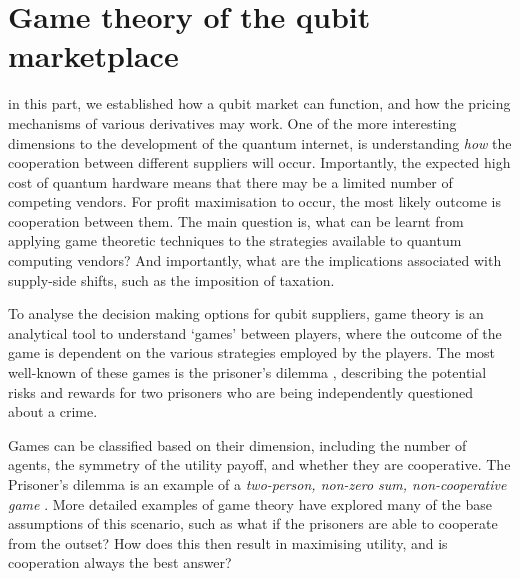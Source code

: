 %
%

\section{Game theory of the qubit marketplace}\label{sec:game_theory}


\newline

\startnormtable

 in this part, we established how a qubit market can function, and how the pricing mechanisms of various derivatives may work. One of the more interesting dimensions to the development of the quantum internet, is understanding \textit{how} the cooperation between different suppliers will occur. Importantly, the expected high cost of  quantum hardware means that there may be a limited number of competing vendors. For profit maximisation to occur, the most likely outcome is cooperation between them. The main question is, what can be learnt from applying game theoretic techniques to the strategies available to quantum computing vendors? And importantly, what are the implications associated with supply-side shifts, such as the imposition of taxation.

To analyse the decision making options for qubit suppliers, game theory is an analytical tool to understand `games' between players, where the outcome of the game is dependent on the various strategies employed by the players. The most well-known of these games is the prisoner's dilemma \cite{bib:Poundstone93}, describing the potential risks and rewards for two prisoners who are being independently questioned about a crime. 

Games can be classified based on their dimension, including the number of agents, the symmetry of the utility payoff, and whether they are cooperative. The Prisoner's dilemma is an example of a \textit{two-person, non-zero sum, non-cooperative game} \cite{bib:Bacharach76}. More detailed examples of game theory have explored many of the base assumptions of this scenario, such as what if the prisoners are able to cooperate from the outset? How does this then result in maximising utility, and is cooperation always the best answer?

